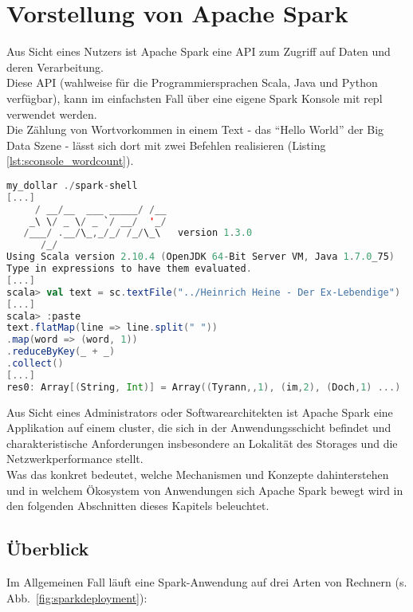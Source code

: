 \chapter{Vorstellung von Apache Spark}
Aus Sicht eines Nutzers ist Apache Spark eine API zum Zugriff auf Daten und deren Verarbeitung.\\

Diese API (wahlweise für die Programmiersprachen Scala, Java und Python verfügbar), kann im einfachsten Fall über eine eigene Spark Konsole mit \gls{repl}\cite{Hail} verwendet werden.\\
Die Zählung von Wortvorkommen in einem Text - das "`Hello World"' der Big Data Szene - lässt sich dort mit zwei Befehlen realisieren (Listing \ref{lst:sconsole_wordcount}).\\

\begin{lstlisting}[language=Scala,caption={Word Count in der Spark Konsole},label={lst:sconsole_wordcount}]
my_dollar ./spark-shell
[...]
     / __/__  ___ _____/ /__
    _\ \/ _ \/ _ `/ __/  '_/
   /___/ .__/\_,_/_/ /_/\_\   version 1.3.0
      /_/
Using Scala version 2.10.4 (OpenJDK 64-Bit Server VM, Java 1.7.0_75)
Type in expressions to have them evaluated.
[...]
scala> val text = sc.textFile("../Heinrich Heine - Der Ex-Lebendige")
[...]
scala> :paste
text.flatMap(line => line.split(" "))
.map(word => (word, 1))
.reduceByKey(_ + _)
.collect()
[...]
res0: Array[(String, Int)] = Array((Tyrann,,1), (im,2), (Doch,1) ...)
\end{lstlisting}


Aus Sicht eines Administrators oder Softwarearchitekten ist Apache Spark eine Applikation auf einem \gls{cluster}, die sich in der Anwendungsschicht befindet und charakteristische Anforderungen insbesondere an Lokalität des Storages und die Netzwerkperformance stellt.\\

Was das konkret bedeutet, welche Mechanismen und Konzepte dahinterstehen und in welchem Ökosystem von Anwendungen sich Apache Spark bewegt wird in den folgenden Abschnitten dieses Kapitels beleuchtet.

\section{Überblick}
Im Allgemeinen Fall läuft eine Spark-Anwendung auf drei Arten von Rechnern (s. Abb.~\ref{fig:sparkdeployment}):

